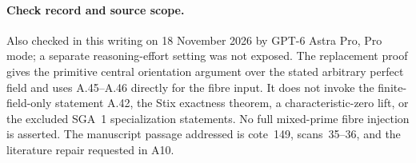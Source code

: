 \paragraph{Check record and source scope.}
Also checked in this writing on 18 November 2026 by GPT-6 Astra
Pro, Pro mode; a separate reasoning-effort setting was not
exposed. The replacement proof gives the primitive central
orientation argument over the stated arbitrary perfect field
and uses A.45--A.46 directly for the fibre input. It does not
invoke the finite-field-only statement A.42, the Stix exactness
theorem, a characteristic-zero lift, or the excluded SGA~1
specialization statements. No full mixed-prime fibre injection
is asserted. The manuscript passage addressed is cote~149,
scans~35--36, and the literature repair requested in A10.
